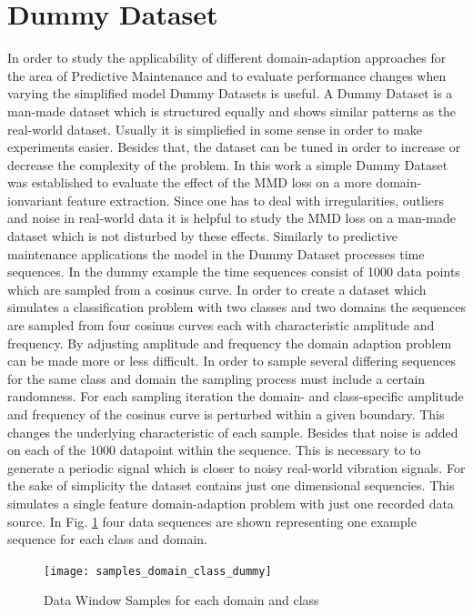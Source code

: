 \section{Dummy Dataset}
In order to study the applicability of different domain-adaption approaches for the area of Predictive Maintenance and to evaluate performance changes when varying the simplified model Dummy Datasets is useful. A Dummy Dataset is a man-made dataset which is structured equally and shows similar patterns as the real-world dataset. Usually it is simpliefied in some sense in order to make experiments easier. Besides that, the dataset can be tuned in order to increase or decrease the complexity of the problem. 
In this work a simple Dummy Dataset was established to evaluate the effect of the MMD loss on a more domain-ionvariant feature extraction. Since one has to deal with irregularities, outliers and noise in real-world data it is helpful to study the MMD loss on a man-made dataset which is not disturbed by these effects. Similarly to predictive maintenance applications the model in the Dummy Dataset processes time sequences. In the dummy example the time sequences consist of 1000 data points which are sampled from a cosinus curve. In order to create a dataset which simulates a classification problem with two classes and two domains the sequences are sampled from four cosinus curves each with characteristic amplitude and frequency. By adjusting amplitude and frequency the domain adaption problem can be made more or less difficult. In order to sample several differing sequences for the same class and domain the sampling process must include a certain randomness. For each sampling iteration the domain- and class-specific amplitude and frequency of the cosinus curve is perturbed within a given boundary. This changes the underlying characteristic of each sample. Besides that noise is added on each of the 1000 datapoint within the sequence. This is necessary to to generate a periodic signal which is closer to noisy real-world vibration signals. For the sake of simplicity the dataset contains just one dimensional sequencies. This simulates a single feature domain-adaption problem with just one recorded data source. In Fig. \ref{fig:samples_domain_class_dummy} four data sequences are shown representing one example sequence for each class and domain. 

\begin{figure}[htpb]
  \centering
  \texttt{[image: samples\_domain\_class\_dummy]}
  \caption {Data Window Samples for each domain and class}
  \label{fig:samples_domain_class_dummy}
\end{figure}
\FloatBarrier 

